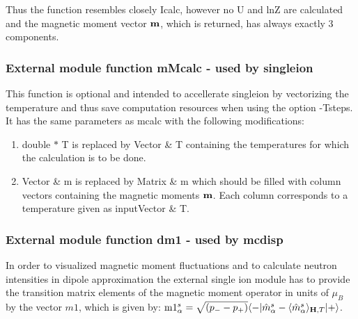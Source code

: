 Thus the function resembles closely Icalc, however no U and lnZ are calculated and
the magnetic moment vector $\mathbf m$, which is returned, has always exactly 3 components.
\subsubsection{External module function {\prg mMcalc} - used by 
{\prg singleion} }

This function is optional and intended to accellerate {\prg singleion} by vectorizing the temperature and
thus save computation resources when using the option {\prg -Tsteps}. It has the same parameters as 
{\prg mcalc} with the following modifications:

\begin{enumerate}
\item  {\prg double $\ast$ T} is replaced by {\prg Vector \& T} containing the temperatures for which 
the calculation is to be done.
\item {\prg Vector \& m } is replaced by {\prg Matrix \& m} which should be filled with column
vectors containing the  magnetic moments $\mathbf m$. Each column corresponds to a temperature given as input{\prg Vector \& T}.
 \end{enumerate}



\subsubsection{External module function {\prg dm1} - used by {\prg mcdisp}}

In order to visualized magnetic moment fluctuations and to calculate neutron intensities
in dipole approximation the external single ion module has to provide the transition
matrix elements of the magnetic moment operator in units of $\mu_B$ by the
vector $m1$, which is given by:
 ${\rm m1}^s_{\alpha}=\sqrt{(p_--p_+)}\langle -|\hat m^s_{\alpha}-\langle\hat  m^s_{\alpha}\rangle_{\mathbf H,T}|+\rangle$. 

